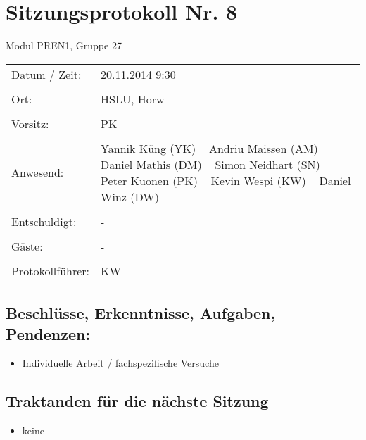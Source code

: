 \documentclass[a4paper,10pt,fleqn]{article}
\begin{document}
\section*{Sitzungsprotokoll Nr. 8}
Modul PREN1, Gruppe 27

\begin{longtable}[l]{@{}p{}@{}p{}@{}}
    Datum / Zeit: &
        20.11.2014 9:30
        \\\\
    Ort: &
        HSLU, Horw
        \\\\
    Vorsitz: &
        PK
        \\\\
    Anwesend: &
        Yannik Küng (YK) ~
        Andriu Maissen (AM) ~
        Daniel Mathis (DM) ~
        Simon Neidhart (SN) ~
        Peter Kuonen (PK) ~
        Kevin Wespi (KW) ~
        Daniel Winz (DW) ~
        \\\\
    Entschuldigt: &
        - ~
        \\\\
    Gäste: &
        - ~
        \\\\
    Protokollführer: &
        KW
        \\
\end{longtable}
%
\subsection*{Beschlüsse, Erkenntnisse, Aufgaben, Pendenzen:}
\begin{itemize}
    \item Individuelle Arbeit / fachspezifische Versuche
\end{itemize}
%
\subsection*{Traktanden für die nächste Sitzung}
\begin{itemize}
    \item keine
\end{itemize}
%
\end{document}

